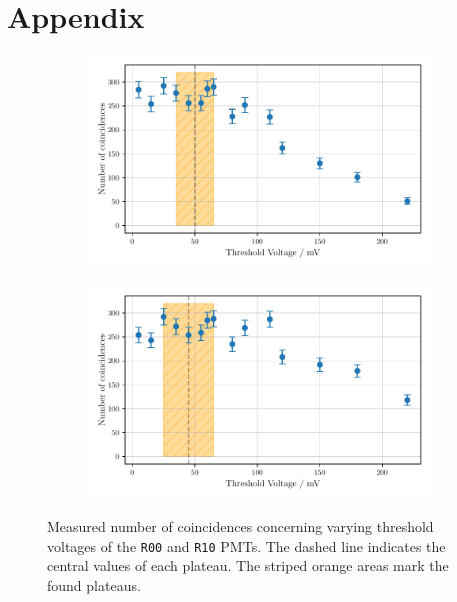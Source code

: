 \chapter{Appendix}
\label{sec:appendix}
\begin{figure}
    \centering
    \begin{subfigure}[b]{0.48\textwidth}
    \includegraphics[width=\textwidth]{plots/threshR00.pdf}
\end{subfigure}\hfill
\begin{subfigure}[b]{0.48\textwidth}
    \includegraphics[width=\textwidth]{plots/threshR10_2.pdf}
\end{subfigure}
\caption{Measured number of coincidences concerning varying threshold voltages
of the \texttt{R00} and \texttt{R10} PMTs.
The dashed line indicates the central values of each plateau. The striped orange areas mark the found plateaus.}
\label{fig:appthresh1}
\end{figure}
